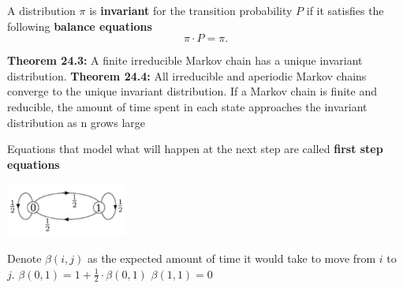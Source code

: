 {\begin{minipage}{16.3cm}
\vspace{.5cm}

A distribution $\pi$ is \textbf{invariant} for the transition probability $P$ if it satisfies the following \textbf{balance equations}
\[\pi \cdot P = \pi.\]

\textbf{Theorem 24.3:} A finite irreducible Markov chain has a unique 
invariant distribution.
\textbf{Theorem 24.4:} All irreducible and aperiodic Markov chains 
converge to the unique invariant distribution. If a Markov chain is 
finite and reducible, the amount of time spent in each state approaches 
the invariant distribution as n grows large

Equations that model what will happen at the next step are called 
\textbf{first step equations}

\vspace{.5cm}

\begin{minipage}[b]{0.6\linewidth}
\begin{center}
\includegraphics[width=4cm]{definitions_markov_chain.jpg} 
\end{center}
\end{minipage}%
\hfill
\begin{minipage}[b]{0.4\linewidth}
Denote $\beta(i, j)$ as the expected amount of time it would take to 
move from $i$ to $j$.
$\beta(0, 1) = 1 + \frac{1}{2} \cdot \beta(0, 1)$
$\beta(1, 1) = 0$

\end{minipage}

\end{minipage}}